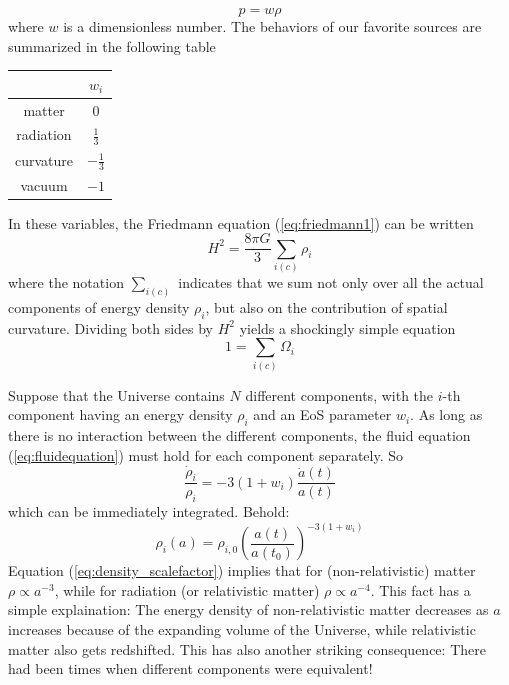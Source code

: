 \begin{equation}
    p = w\rho
    \label{eq:eos}
\end{equation}
where $w$ is a dimensionless number. The behaviors of our favorite sources are summarized in the following table
\begin{table}[h!]
    \centering
    \begin{tabular}{c|c}
        & $w_{i}$ \\
        \hline
        matter & 0\\
        radiation & $\frac{1}{3}$\\
        curvature & $-\frac{1}{3}$\\
        vacuum & $-1$
    \end{tabular}
\end{table}
\par In these variables, the Friedmann equation (\ref{eq:friedmann1}) can be written
\begin{equation}
    H^{2} = \frac{8\pi G}{3}\sum_{i(c)}\rho_{i}
    \label{eq:friedmann_alt}
\end{equation}
where the notation $\sum_{i(c)}$ indicates that we sum not only over all the actual components of energy density $\rho_{i}$, but also on the contribution of spatial curvature. Dividing both sides by $H^{2}$ yields a shockingly simple equation
\begin{equation}
    1 = \sum_{i(c)}\Omega_{i}
\end{equation}
\par Suppose that the Universe contains $N$ different components, with the $i$-th component having an energy density $\rho_{i}$ and an EoS parameter $w_{i}$. As long as there is no interaction between the different components, the fluid equation (\ref{eq:fluidequation}) must hold for each component separately. So
\begin{equation}
    \frac{\dot{\rho}_{i}}{\rho_{i}} = -3(1+w_{i})\frac{\dot{a}(t)}{a(t)}
\end{equation}
which can be immediately integrated. Behold:
\begin{equation}
    \boxed{
    \rho_{i}(a) = \rho_{i,0}\left(\frac{a(t)}{a(t_{0})}\right)^{-3(1+w_{i})}
    }
    \label{eq:density_scalefactor}
\end{equation}
Equation (\ref{eq:density_scalefactor}) implies that for (non-relativistic) matter $\rho \propto a^{-3}$, while for radiation (or relativistic matter) $\rho\propto a^{-4}$. This fact has a simple explaination: The energy density of non-relativistic matter decreases as $a$ increases because of the expanding volume of the Universe, while relativistic matter also gets redshifted. This has also another striking consequence: There had been times when different components were equivalent!
